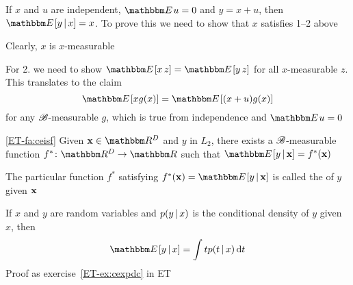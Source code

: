 \begin{frame}

    \vspace{2em}

    \Eg
        If $x$ and $u$ are independent, $\EE u=0$  and $y = x + u$, then $\EE[y
        \given x] = x$.  To prove this we need to show that $x$ satisfies
        1--2 above
        
        Clearly, $x$ is $x$-measurable
        
        For 2. we need to show  $\EE[x \, z] = \EE[y\, z]$ for all $x$-measurable $z$.  This
        translates to the claim
        \begin{equation*}
            \EE[ x g(x)] = \EE[ (x + u) g(x)]
        \end{equation*}
        for any $\mathscr B$-measurable $g$, which is true from independence and $\EE u = 0$


\end{frame}

\begin{frame}

    \vspace{2em}
    \Fact\eqref{ET-fa:ceisf}
        Given $\boldx \in \RR^D$ and $y$ in $L_2$, there exists a $\mathscr B$-measurable
        function $f^* \colon \RR^D \to \RR$ such that $\EE[y \given \boldx] =
        f^*(\boldx)$
    
    The particular function $f^*$ satisfying
    $f^*(\boldx) = \EE[y \given \boldx]$ is called the 
    of $y$ given ${\mathbf x}$
    
    \vspace{1em}
    \Eg
    If $x$ and $y$ are random variables and $p(y \, | \, x)$ is the conditional
    density of $y$ given $x$, then
    \begin{equation*}
        \EE[ y \given x] = \int t p(t \given x) \diff t
    \end{equation*}
    Proof as exercise~\ref{ET-ex:cexpdc} in ET

\end{frame}

